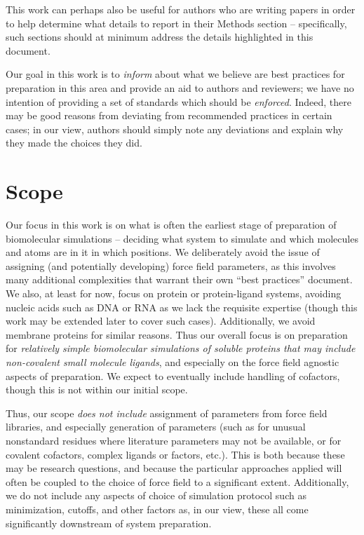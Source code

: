 \documentclass[9pt]{livecoms}
\begin{document}
This work can perhaps also be useful for authors who are writing papers in order to help determine what details to report in their Methods section -- specifically, such sections should at minimum address the details highlighted in this document. 

Our goal in this work is to \emph{inform} about what we believe are best practices for preparation in this area and provide an aid to authors and reviewers; we have no intention of providing a set of standards which should be \emph{enforced}. 
Indeed, there may be good reasons from deviating from recommended practices in certain cases; in our view, authors should simply note any deviations and explain why they made the choices they did. 

\section{Scope}

Our focus in this work is on what is often the earliest stage of preparation of biomolecular simulations -- deciding what system to simulate and which molecules and atoms are in it in which positions. 
We deliberately avoid the issue of assigning (and potentially developing) force field parameters, as this involves many additional complexities that warrant their own ``best practices'' document.
We also, at least for now, focus on protein or protein-ligand systems, avoiding nucleic acids such as DNA or RNA as we lack the requisite expertise (though this work may be extended later to cover such cases). 
Additionally, we avoid membrane proteins for similar reasons.
Thus our overall focus is on preparation for \emph{relatively simple biomolecular simulations of soluble proteins that may include non-covalent small molecule ligands}, and especially on the force field agnostic aspects of preparation.
We expect to eventually include handling of cofactors, though this is not within our initial scope.

Thus, our scope \emph{does not include} assignment of parameters from force field libraries, and especially generation of parameters (such as for unusual nonstandard residues where literature parameters may not be available, or for covalent cofactors, complex ligands or factors, etc.). 
This is both because these may be research questions, and because the particular approaches applied will often be coupled to the choice of force field to a significant extent.
Additionally, we do not include any aspects of choice of simulation protocol such as minimization, cutoffs, and other factors as, in our view, these all come significantly downstream of system preparation. 
\end{document}
